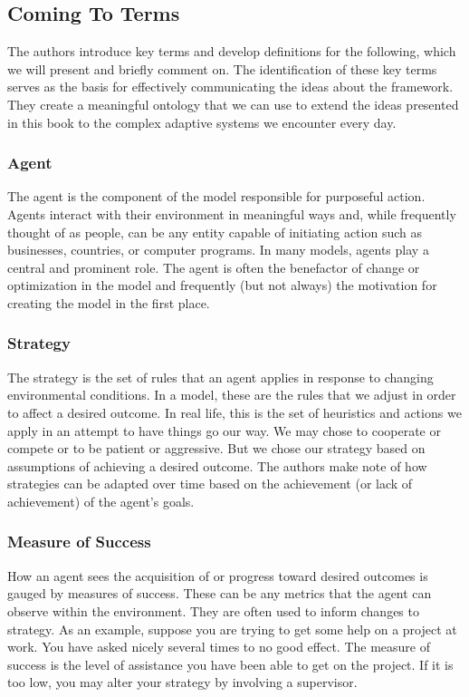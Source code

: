 \documentclass[jou,apacite]{apa6}
\begin{document}
\subsection{Coming To Terms}

The authors introduce key terms and develop definitions for the following, which we will present and briefly comment on.  The identification of these key terms serves as the basis for effectively communicating the ideas about the framework. They create a meaningful ontology that we can use to extend the ideas presented in this book to the complex adaptive systems we encounter every day.

\subsubsection{Agent}
The agent is the component of the model responsible for purposeful action.  Agents interact with their environment in meaningful ways and, while frequently thought of as people, can be any entity capable of initiating action such as businesses, countries, or computer programs.  In many models, agents play a central and prominent role.  The agent is often the benefactor of change or optimization in the model and frequently (but not always) the motivation for creating the model in the first place.

\subsubsection{Strategy}
The strategy is the set of rules that an agent applies in response to changing environmental conditions.  In a model, these are the rules that we adjust in order to affect a desired outcome.  In real life, this is the set of heuristics and actions we apply in an attempt to have things go our way.  We may chose to cooperate or compete or to be patient or aggressive.  But we chose our strategy based on assumptions of achieving a desired outcome.  The authors make note of how strategies can
be adapted over time based on the achievement (or lack of achievement) of the agent's goals.

\subsubsection{Measure of Success}
How an agent sees the acquisition of or progress toward desired outcomes is gauged by measures of success.  These can be any metrics that the agent can observe within the environment.  They are often used to inform changes to strategy.  As an example, suppose you are trying to get some help on a project at work.  You have asked nicely several times to no good effect.  The measure of success is the level of assistance you have been able to get on the project.  If it is too low, you may alter
your strategy by involving a supervisor.
\end{document}
